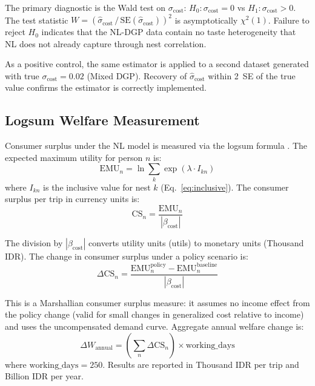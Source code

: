 \documentclass[12pt,a4paper]{article}
\begin{document}
The primary diagnostic is the Wald test on $\sigma_{\text{cost}}$: $H_0: \sigma_{\text{cost}} = 0$ vs $H_1: \sigma_{\text{cost}} > 0$. The test statistic $W = (\hat{\sigma}_{\text{cost}} \,/\, \text{SE}(\hat{\sigma}_{\text{cost}}))^2$ is asymptotically $\chi^2(1)$. Failure to reject $H_0$ indicates that the NL-DGP data contain no taste heterogeneity that NL does not already capture through nest correlation.

As a positive control, the same estimator is applied to a second dataset generated with true $\sigma_{\text{cost}} = 0.02$ (Mixed DGP). Recovery of $\hat{\sigma}_{\text{cost}}$ within 2~SE of the true value confirms the estimator is correctly implemented.

\subsection{Logsum Welfare Measurement}

Consumer surplus under the NL model is measured via the logsum formula \citep{benakiva1985,train2009}. The expected maximum utility for person $n$ is:
\begin{equation}
\text{EMU}_n = \ln \sum_k \exp(\lambda \cdot I_{kn})
\label{eq:emu}
\end{equation}
where $I_{kn}$ is the inclusive value for nest $k$ (Eq.~\ref{eq:inclusive}). The consumer surplus per trip in currency units is:
\begin{equation}
\text{CS}_n = \frac{\text{EMU}_n}{|\beta_{\text{cost}}|}
\label{eq:cs}
\end{equation}

The division by $|\beta_{\text{cost}}|$ converts utility units (utils) to monetary units (Thousand IDR). The change in consumer surplus under a policy scenario is:
\begin{equation}
\Delta\text{CS}_n = \frac{\text{EMU}_n^{\text{policy}} - \text{EMU}_n^{\text{baseline}}}{|\beta_{\text{cost}}|}
\label{eq:dcs}
\end{equation}

This is a Marshallian consumer surplus measure: it assumes no income effect from the policy change (valid for small changes in generalized cost relative to income) and uses the uncompensated demand curve. Aggregate annual welfare change is:
\begin{equation}
\Delta W_{\text{annual}} = \left(\sum_n \Delta\text{CS}_n\right) \times \text{working\_days}
\label{eq:annualw}
\end{equation}
where $\text{working\_days} = 250$. Results are reported in Thousand IDR per trip and Billion IDR per year.
\end{document}
